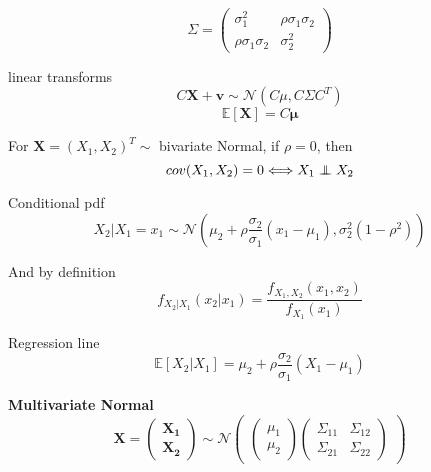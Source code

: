 \documentclass[twocolumn]{amsart}
\newcommand{\E}{\mathbb{E}}
\newcommand\independent{\protect\mathpalette{\protect\independenT}{\perp}}
\def\independenT#1#2{\mathrel{\rlap{$#1#2$}\mkern3mu{#1#2}}}
\begin{document}
\begin{equation*}
  \Sigma =
  \begin{pmatrix}
    \sigma_{1}^2 & \rho \sigma_{1} \sigma_{2} \\
    \rho \sigma_{1} \sigma_{2} & \sigma_{2}^2
  \end{pmatrix}
\end{equation*}


linear transforms
\begin{equation*}
  C\textbf{X} + \textbf{v} \sim \mathcal{N}(C\mu, C \Sigma C^T)
\end{equation*}
\begin{equation*}
  \E[\textbf{X}] = C\boldsymbol{\mu}
\end{equation*}

For \(\textbf{X} = (X_{1},X_{2})^T \sim \) bivariate Normal, if \(\rho = 0\), then
\begin{equation*}
  cov(X_{1},X_{2}) = 0 \Longleftrightarrow X_{1} \independent X_{2}
\end{equation*}

Conditional pdf
\begin{equation*}
  X_{2} | X_{1} = x_{1} \sim \mathcal{N}(\mu_{2} + \rho\frac{\sigma_{2}}{\sigma_{1}}(x_{1}-\mu_{1}),\sigma_{2}^{2}(1-\rho^{2}))
\end{equation*}

And by definition
\begin{equation*}
  f_{X_{2}|X_{1}}(x_{2}|x_{1}) = \frac{f_{X_{1},X_{2}}(x_{1},x_{2})}{f_{X_{1}}(x_{1})}
\end{equation*}

Regression line
\begin{equation*}
  \E[X_{2}|X_{1}] = \mu_{2} + \rho\frac{\sigma_{2}}{\sigma_{1}}(X_{1} - \mu_{1})
\end{equation*}

\textbf{Multivariate Normal}
\begin{equation*}
  \textbf{X} =
  \begin{pmatrix}
    \boldsymbol{X_{1}} \\
    \boldsymbol{X_{2}}
  \end{pmatrix}
  \sim
  \mathcal{N}
  \begin{pmatrix}
    \begin{pmatrix}
      \mu_{1} \\
      \mu_{2}
    \end{pmatrix}
    \begin{pmatrix}
      \Sigma_{11} & \Sigma_{12} \\
      \Sigma_{21} & \Sigma_{22}
    \end{pmatrix}
  \end{pmatrix}
\end{equation*}
\end{document}
